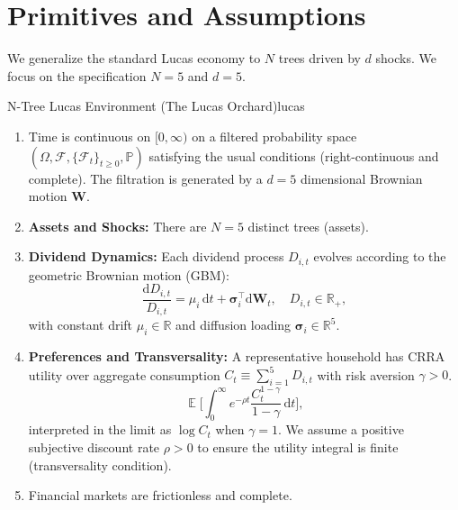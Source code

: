 \documentclass[11pt,letterpaper,oneside]{article}
\numberwithin{equation}{section}
\DeclareMathOperator{\E}{\mathbb{E}}
\newcommand{\R}{\mathbb{R}}
\newcommand{\1}{\mathbf{1}}
\newcommand{\diff}{\mathrm{d}}
\begin{document}
\section{Primitives and Assumptions}\label{sec:primitives}

We generalize the standard Lucas economy to $N$ trees driven by $d$ shocks. We focus on the specification $N=5$ and $d=5$.

\begin{assumption}{N-Tree Lucas Environment (The Lucas Orchard)}{lucas}
\begin{enumerate}[leftmargin=1.25em]
  \item Time is continuous on $[0,\infty)$ on a filtered probability space $(\Omega, \mathcal{F}, \{\mathcal{F}_t\}_{t\geq 0}, \mathbb{P})$ satisfying the usual conditions (right-continuous and complete). The filtration is generated by a $d=5$ dimensional Brownian motion $\bm W$.
  \item \textbf{Assets and Shocks:} There are $N=5$ distinct trees (assets).
  \item \textbf{Dividend Dynamics:} Each dividend process $D_{i,t}$ evolves according to the geometric Brownian motion (GBM):
  \begin{equation}\label{eq:dividend}
    \frac{\diff D_{i,t}}{D_{i,t}} = \mu_i\,\diff t + \bm{\sigma}_i^{\top}\diff \bm W_t, \quad D_{i,t} \in \R_+,
  \end{equation}
  with constant drift $\mu_i\in\R$ and diffusion loading $\bm{\sigma}_i\in\R^5$.
  \item \textbf{Preferences and Transversality:} A representative household has CRRA utility over aggregate consumption $C_t \equiv \sum_{i=1}^5 D_{i,t}$ with risk aversion $\gamma>0$.
  \begin{equation}\label{eq:utility}
    \E\Big[\int_0^{\infty} e^{-\rho t} \frac{C_t^{1-\gamma}}{1-\gamma}\,\diff t\Big],
  \end{equation}
  interpreted in the limit as $\log C_t$ when $\gamma=1$. We assume a positive subjective discount rate $\rho>0$ to ensure the utility integral is finite (transversality condition).
  \item Financial markets are frictionless and complete.
\end{enumerate}
\end{assumption}
\end{document}
